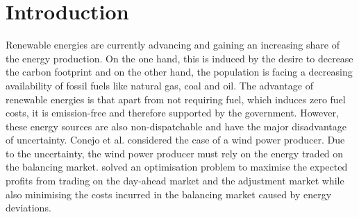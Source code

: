 \section{Introduction}

Renewable energies are currently advancing and gaining an increasing share of the energy production. On the one hand, this is induced by the desire to decrease the carbon footprint and on the other hand, the population is facing a decreasing availability of fossil fuels like natural gas, coal and oil. The advantage of renewable energies is that apart from not requiring fuel, which induces zero fuel costs, it is emission-free and therefore supported by the government. However, these energy sources are also non-dispatchable and have the major disadvantage of uncertainty. Conejo et al. considered the case of a wind power producer. Due to the uncertainty, the wind power producer must rely on the energy traded on the balancing market.  solved an optimisation problem  to maximise the expected profits from trading on the day-ahead market and the adjustment market while also minimising the costs incurred in the balancing market caused by energy deviations. 


